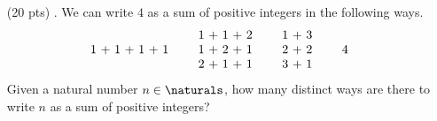 \begin{enumerate}
  \item[(20 pts) \quad 4.]
    We can write $4$ as a sum of positive integers in the following ways.
    \begin{equation*}
      \begin{tabular}{cccccccc}
                      &\quad& 1 + 1 + 2 &\quad& 1 + 3           \\
        1 + 1 + 1 + 1 &\quad& 1 + 2 + 1 &\quad& 2 + 2 &\quad& 4 \\
                      &\quad& 2 + 1 + 1 &\quad& 3 + 1           \\
      \end{tabular}
    \end{equation*}
    Given a natural number $n \in \naturals$, how many distinct ways are there to write $n$ as a sum of positive integers?


\end{enumerate}
